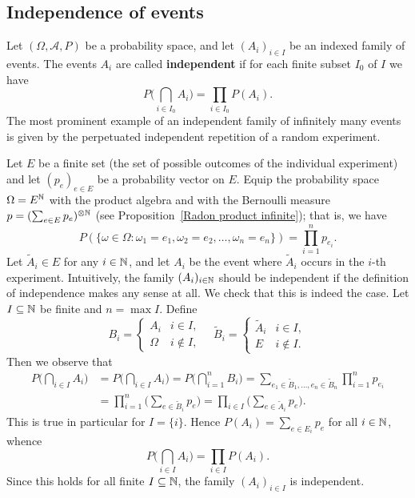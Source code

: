 \subsection{Independence of events}
Let $(\Omega,\mathcal{A},P)$ be a probability space, and let $(A_i)_{i\in I}$ be an indexed family of events. The events $A_i$ are called \textbf{independent} if for each finite subset $I_0$ of $I$ we have
\[P\Big(\bigcap_{i\in I_0}A_i\Big)=\prod_{i\in I_0}P(A_i).\]
The most prominent example of an independent family of infinitely many events is given by the perpetuated independent repetition of a random experiment.
\begin{example}\label{infinite Bernoulli experiment independent}
Let $E$ be a finite set (the set of possible outcomes of the individual experiment) and let $(p_e)_{e\in E}$ be a probability vector on $E$. Equip the probability space $\Omega=E^{\mathbb{N}}$ with the product algebra and with the Bernoulli measure $p=(\sum_{e\in E}p_e)^{\otimes\mathbb{N}}$ (see Proposition~\ref{Radon product infinite}); that is, we have
\[P(\{\omega\in\Omega:\omega_1=e_1,\omega_2=e_2,\dots,\omega_n=e_n\})=\prod_{i=1}^{n}p_{e_i}.\]
Let $\widetilde{A}_i\in E$ for any $i\in\mathbb{N}$, and let $A_i$ be the event where $\widetilde{A}_i$ occurs in the $i$-th experiment. Intuitively, the family $(A_i)_{i\in\mathbb{N}}$ should be independent if the definition of independence makes any sense at all. We check that this is indeed the case. Let $I\subseteq\mathbb{N}$ be finite and $n=\max I$. Define
\[B_i=\begin{cases}
A_i&i\in I,\\
\Omega&i\notin I,
\end{cases}\quad\widetilde{B}_i=\begin{cases}
\widetilde{A}_i&i\in I,\\
E&i\notin I.
\end{cases}
\]
Then we observe that
\begin{align*}
P\Big(\bigcap_{i\in I}A_i\Big)&=P\Big(\bigcap_{i\in I}A_i\Big)=P\Big(\bigcap_{i=1}^{n}B_i\Big)=\sum_{e_1\in\widetilde{B}_1,\dots,e_n\in\widetilde{B}_n}\prod_{i=1}^{n}p_{e_i}\\
&=\prod_{i=1}^{n}\Big(\sum_{e\in\widetilde{B}_i}p_e\Big)=\prod_{i\in I}\Big(\sum_{e\in\widetilde{A}_i}p_e\Big).
\end{align*}
This is true in particular for $I=\{i\}$. Hence $P(A_i)=\sum_{e\in E_i}p_e$ for all $i\in\mathbb{N}$, whence
\[P\Big(\bigcap_{i\in I}A_i\Big)=\prod_{i\in I}P(A_i).\]
Since this holds for all finite $I\subseteq\mathbb{N}$, the family $(A_i)_{i\in I}$ is independent.
\end{example}
